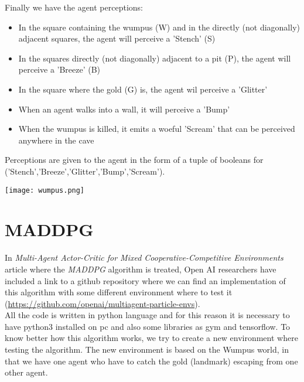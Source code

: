 \documentclass[]{report}
\begin{document}
\vspace{7 mm}
Finally we have the agent perceptions:
\vspace{5 mm}

\begin{itemize}
  \item In the square containing the wumpus (W) and in the directly (not diagonally) adjacent squares, the agent will perceive a 'Stench' (S)
  \item In the squares directly (not diagonally) adjacent to a pit (P), the agent will perceive a 'Breeze' (B)
  \item In the square where the gold (G) is, the agent wil perceive a 'Glitter'
  \item When an agent walks into a wall, it will perceive a 'Bump'
  \item When the wumpus is killed, it emits a woeful 'Scream' that can be perceived anywhere in the cave
\end{itemize}

Perceptions are given to the agent in the form of a tuple of booleans for
('Stench','Breeze','Glitter','Bump','Scream').

\vspace{10 mm}

\begin{center}
	\texttt{[image: wumpus.png]}
\end{center}
 
\vspace{30 mm}
\section{MADDPG}
In \emph{Multi-Agent Actor-Critic for Mixed Cooperative-Competitive Environments} article where the \emph{MADDPG} algorithm is treated, Open AI researchers have included a link to a github repository where we can find an implementation of this algorithm with some different environment where to test it (\url{https://github.com/openai/multiagent-particle-envs}).\\ 
All the code is written in python language and for this reason it is necessary to have python3 installed on pc and also some libraries as gym and tensorflow.
To know better how this algorithm works, we try to create a new environment where testing the algorithm.
The new environment is based on the Wumpus world, in that we have one agent who have to catch the gold (landmark) escaping from one other agent.
\end{document}
